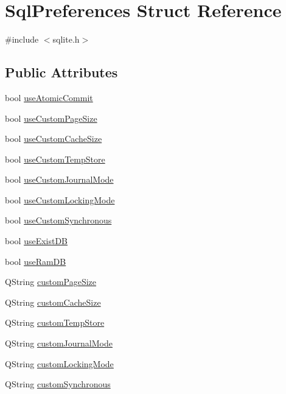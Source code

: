 \hypertarget{structSqlPreferences}{\section{\-Sql\-Preferences \-Struct \-Reference}
\label{structSqlPreferences}
}


{\ttfamily \#include $<$sqlite.\-h$>$}

\subsection*{\-Public \-Attributes}
\begin{DoxyCompactItemize}
\item 
bool \hyperlink{structSqlPreferences_a36464d4021afe0e0919cce650a1519fe}{use\-Atomic\-Commit}
\item 
bool \hyperlink{structSqlPreferences_a7e53d4abaf46acfb84cd8c30fbf3b1df}{use\-Custom\-Page\-Size}
\item 
bool \hyperlink{structSqlPreferences_ad26f9920ddc5ac5f655873d9ecb3ac53}{use\-Custom\-Cache\-Size}
\item 
bool \hyperlink{structSqlPreferences_abcd9f162cf432b71159c7c83adb8ac88}{use\-Custom\-Temp\-Store}
\item 
bool \hyperlink{structSqlPreferences_a9aa98cdd591864c7b2382b2d0fff0de9}{use\-Custom\-Journal\-Mode}
\item 
bool \hyperlink{structSqlPreferences_a22c08a63c97db2f85e08920bf3e22516}{use\-Custom\-Locking\-Mode}
\item 
bool \hyperlink{structSqlPreferences_a3d18d11573e0546e8fe854b7584adab7}{use\-Custom\-Synchronous}
\item 
bool \hyperlink{structSqlPreferences_ae8bb4bc0c82e4f32c51efdbf3d3e1af5}{use\-Exist\-D\-B}
\item 
bool \hyperlink{structSqlPreferences_ad7d06ce81f298cf13b7522e48d640a78}{use\-Ram\-D\-B}
\item 
\-Q\-String \hyperlink{structSqlPreferences_aeaa6fa937ead293aa8cd41b86f1c5cf4}{custom\-Page\-Size}
\item 
\-Q\-String \hyperlink{structSqlPreferences_a623f8f8b12bdde7ce2c69f6388d3719b}{custom\-Cache\-Size}
\item 
\-Q\-String \hyperlink{structSqlPreferences_a36b942f872c390f204cc5542fc0662de}{custom\-Temp\-Store}
\item 
\-Q\-String \hyperlink{structSqlPreferences_afa1cee8e11c7ca38d32e05c92a6b56da}{custom\-Journal\-Mode}
\item 
\-Q\-String \hyperlink{structSqlPreferences_ad99a3e0cc0c19283aa9337e6a28f0a28}{custom\-Locking\-Mode}
\item 
\-Q\-String \hyperlink{structSqlPreferences_a7d309904c4edb9f888d0c8a810def2d1}{custom\-Synchronous}
\end{DoxyCompactItemize}



